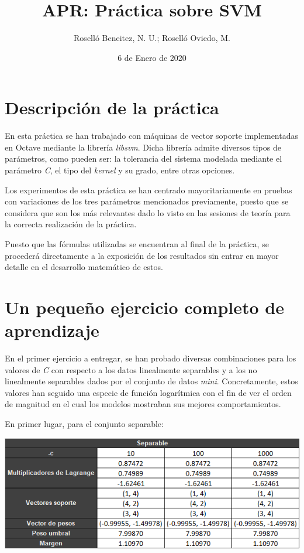 \documentclass[a4paper]{article}
\begin{document}
\author{Roselló Beneitez, N. U.; Roselló Oviedo, M.}
\title{APR: Práctica sobre SVM}
\date{6 de Enero de 2020}
\maketitle{}
\thispagestyle{empty}

\newpage
\tableofcontents
\listoffigures

\newpage
\section{Descripción de la práctica}
\quad En esta práctica se han trabajado con máquinas de vector soporte implementadas en Octave mediante la librería \textit{libsvm}. Dicha librería admite diversos  tipos de parámetros, como pueden ser: la tolerancia del sistema modelada mediante el parámetro \textit{C}, el tipo del \textit{kernel} y su grado, entre otras opciones.

\quad Los experimentos de esta práctica se han centrado mayoritariamente en pruebas con variaciones de los tres parámetros mencionados previamente, puesto que se considera que son los más relevantes dado lo visto en las sesiones de teoría para la correcta realización de la práctica.

\quad Puesto que las fórmulas utilizadas se encuentran al final de la práctica, se procederá directamente a la exposición de los resultados sin entrar en mayor detalle en el desarrollo matemático de estos.

\section{Un pequeño ejercicio completo de aprendizaje}
\quad En el primer ejercicio a entregar, se han probado diversas combinaciones para los valores de \textit{C} con respecto a los datos linealmente separables y a los no linealmente separables dados por el conjunto de datos \textit{mini}. Concretamente, estos valores han seguido una especie de función logarítmica con el fin de ver el orden de magnitud en el cual los modelos mostraban sus mejores comportamientos.

\quad En primer lugar, para el conjunto separable:

\includegraphics[width=\textwidth]{2_Separables}
\end{document}
